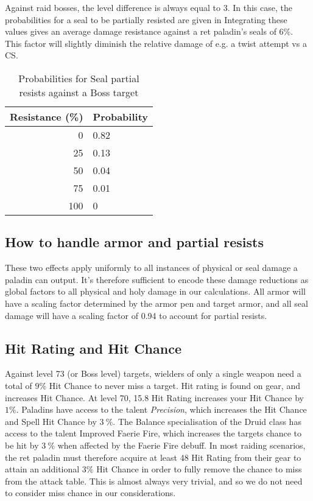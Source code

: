 \documentclass[letterpaper,11pt]{article}
\begin{document}
	Against raid bosses, the level difference is always equal to 3.
	In this case, the probabilities for a seal to be partially resisted are given in 
	Integrating these values gives an average damage resistance against a ret paladin's seals of $6\%$.
	This factor will slightly diminish the relative damage of e.g. a twist attempt vs a CS.
	\begin{table}[htb]
		\centering
			\begin{tabular}{r | l}
				Resistance (\%) & Probability \\
				\hline \hline
				0 & 0.82 \\
				25 & 0.13 \\
				50 & 0.04 \\
				75 & 0.01 \\
				100 & 0 \\
				\hline
			\end{tabular}
	    	\caption{Probabilities for Seal partial resists against a Boss target}		
			\label{tab:glancing}
	\end{table}
	
	\subsection{How to handle armor and partial resists}
	These two effects apply uniformly to all instances of physical or seal damage a paladin can output.
	It's therefore sufficient to encode these damage reductions as global factors to all physical and holy damage in our calculations.
	All armor will have a scaling factor determined by the armor pen and target armor, and all seal damage will have a scaling factor of 0.94 to account for partial resists.

	\subsection{Hit Rating and Hit Chance}
	Against level 73 (or Boss level) targets, wielders of only a single weapon need a total of $9\%$ Hit Chance to never miss a target.
	Hit rating is found on gear, and increases Hit Chance.
	At level 70, 15.8 Hit Rating increases your Hit Chance by $1\%$. 
	Paladins have access to the talent \emph{Precision}, which increases the Hit Chance and Spell Hit Chance by $3~\%$.
	The Balance specialisation of the Druid class has access to the talent Improved Faerie Fire, which increases the targets chance to be hit by $3~\%$ when affected by the Faerie Fire debuff.
	In most raiding scenarios, the ret paladin must therefore acquire at least 48 Hit Rating from their gear to attain an additional $3\%$ Hit Chance in order to fully remove the chance to miss from the attack table.
	This is almost always very trivial, and so we do not need to consider miss chance in our considerations.
		
\end{document}
